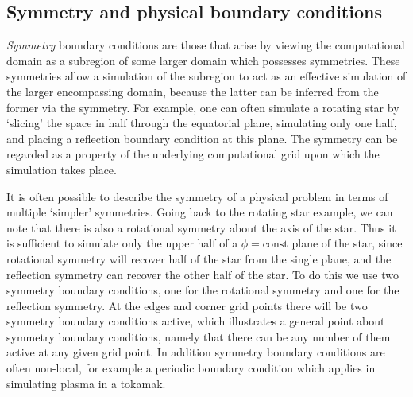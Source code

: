 \documentclass{article}
\begin{document}
\subsection{Symmetry and physical boundary conditions}

\emph{Symmetry} boundary conditions are those that arise by viewing
the computational domain as a subregion of some larger domain which
possesses symmetries.  These symmetries allow a simulation of the
subregion to act as an effective simulation of the larger encompassing
domain, because the latter can be inferred from the former via the
symmetry.  For example, one can often simulate a rotating star by
`slicing' the space in half through the equatorial plane, simulating
only one half, and placing a reflection boundary condition at this
plane.  The symmetry can be regarded as a property of the
underlying computational grid upon which the simulation takes place.

It is often possible to describe the symmetry of a physical problem in
terms of multiple `simpler' symmetries.  Going back to the rotating
star example, we can note that there is also a rotational symmetry
about the axis of the star.  Thus it is sufficient to simulate only
the upper half of a $\phi=\mbox{const}$ plane of the star, since
rotational symmetry will recover half of the star from the single
plane, and the reflection symmetry can recover the other half of the
star.  To do this we use two symmetry boundary conditions, one for the
rotational symmetry and one for the reflection symmetry.  At the edges
and corner grid points there will be two symmetry boundary conditions
active, which illustrates a general point about symmetry boundary
conditions, namely that there can be any number of them active at any
given grid point.  In addition symmetry boundary conditions are often
non-local, for example a periodic boundary condition which applies in
simulating plasma in a tokamak.
\end{document}
